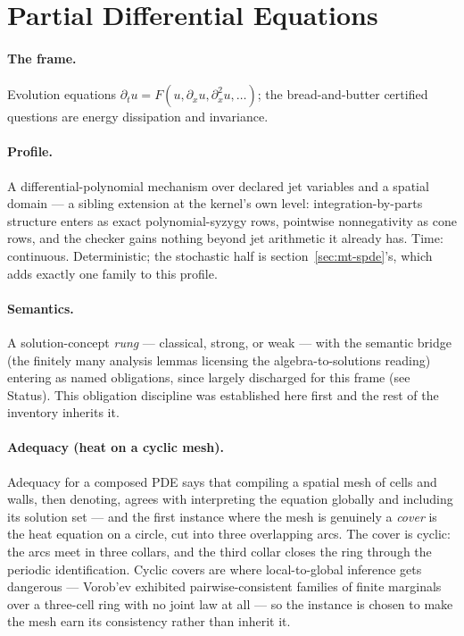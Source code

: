\section{Partial Differential Equations}
\label{sec:mt-pde}

\paragraph{The frame.} Evolution equations $\partial_t u =
F(u, \partial_x u, \partial_x^2 u, \ldots)$; the bread-and-butter
certified questions are energy dissipation and invariance.

\paragraph{Profile.} A differential-polynomial mechanism over
declared jet variables and a spatial domain --- a sibling extension
at the kernel's own level: integration-by-parts structure enters as
exact polynomial-syzygy rows, pointwise nonnegativity as cone rows,
and the checker gains nothing beyond jet arithmetic it already has.
Time: continuous. Deterministic; the stochastic half is
section~\ref{sec:mt-spde}'s, which adds exactly one family to this
profile.

\paragraph{Semantics.} A solution-concept \emph{rung} --- classical,
strong, or weak --- with the semantic bridge (the finitely many
analysis lemmas licensing the algebra-to-solutions reading) entering
as named obligations, since largely discharged for this frame (see
Status). This obligation discipline was established here first and
the rest of the inventory inherits it.

\paragraph{Adequacy (heat on a cyclic mesh).} Adequacy for a composed
PDE says that compiling a spatial mesh of cells and walls, then
denoting, agrees with interpreting the equation globally and
including its solution set --- and the first instance where the mesh
is genuinely a \emph{cover} is the heat equation on a circle, cut
into three overlapping arcs.  The cover is cyclic: the arcs meet in
three collars, and the third collar closes the ring through the
periodic identification.  Cyclic covers are where local-to-global
inference gets dangerous --- Vorob'ev exhibited
pairwise-consistent families of finite marginals over a three-cell
ring with no joint law at all \cite{vorobev-1962} --- so the
instance is chosen to make the mesh earn its consistency rather than
inherit it.

